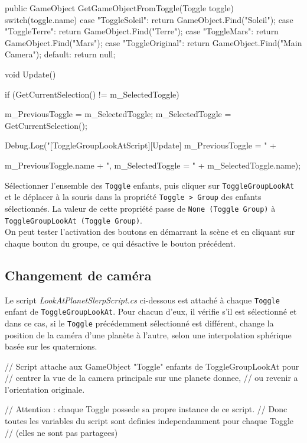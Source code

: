 \documentclass[a4paper,10pt]{article}
\newenvironment{solution}%
{\begin{tcolorbox}[breakable,colback=red!5!white,colframe=red!75!black,title=Solution]}%
{\end{tcolorbox}}
\newenvironment{boxcode}%
{\begin{tcolorbox}[breakable,colback=gray!5!white,colframe=black]}%
	{\end{tcolorbox}}
\begin{document}
\begin{solution}
\begin{boxcode}
\begin{csharpsansbord}
{  public GameObject GetGameObjectFromToggle(Toggle toggle) {
	switch(toggle.name) {
		case "ToggleSoleil":
			return GameObject.Find("Soleil");
		case "ToggleTerre":
			return GameObject.Find("Terre");
		case "ToggleMars":
			return GameObject.Find("Mars");
		case "ToggleOriginal":
			return GameObject.Find("Main Camera");
		default:
			return null;
	}
  }

  void Update() {
	if (GetCurrentSelection() != m_SelectedToggle) {
		m_PreviousToggle = m_SelectedToggle;
		m_SelectedToggle = GetCurrentSelection();

		Debug.Log("[ToggleGroupLookAtScript][Update] m_PreviousToggle = " +

		m_PreviousToggle.name + ", m_SelectedToggle = " +
		m_SelectedToggle.name);
	}
  }
}
\end{csharpsansbord}
\end{boxcode}

Sélectionner l'ensemble des \texttt{Toggle} enfants, puis cliquer sur \texttt{ToggleGroupLookAt} et le déplacer à la souris dans la propriété \texttt{Toggle > Group} des enfants sélectionnés. La valeur de cette propriété passe de \texttt{None (Toggle Group)} à \texttt{ToggleGroupLookAt (Toggle Group)}.\\

On peut tester l'activation des boutons en démarrant la scène et en cliquant sur chaque bouton du groupe, ce qui désactive le bouton précédent.

\subsection{Changement de caméra}

Le script \textit{LookAtPlanetSlerpScript.cs} ci-dessous est attaché à chaque \texttt{Toggle} enfant de \texttt{ToggleGroupLookAt}. Pour chacun d'eux, il vérifie s'il est sélectionné et dans ce cas,  si le \texttt{Toggle} précédemment sélectionné est différent, change la position de la caméra d'une planète à l'autre, selon une interpolation sphérique basée sur les quaternions.

\begin{boxcode}
	\begin{csharpsansbord}
// Script attache aux GameObject "Toggle" enfants de ToggleGroupLookAt pour
//  centrer la vue de la camera principale sur une planete donnee, 
// ou revenir a l'orientation originale.

// Attention : chaque Toggle possede sa propre instance de ce script.
// Donc toutes les variables du script sont definies independamment pour chaque Toggle
// (elles ne sont pas partagees)


\end{csharpsansbord}
\end{boxcode}
\end{solution}
\end{document}
